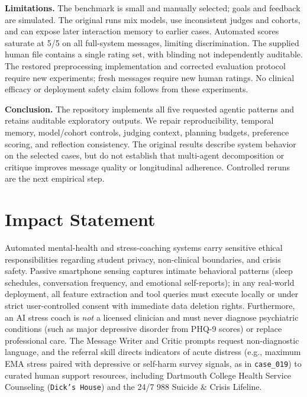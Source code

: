 \documentclass{article}
\begin{document}
\textbf{Limitations.} The benchmark is small and manually selected; goals and feedback are simulated. The original runs mix models, use inconsistent judges and cohorts, and can expose later interaction memory to earlier cases. Automated scores saturate at 5/5 on all full-system messages, limiting discrimination. The supplied human file contains a single rating set, with blinding not independently auditable. The restored preprocessing implementation and corrected evaluation protocol require new experiments; fresh messages require new human ratings. No clinical efficacy or deployment safety claim follows from these experiments.

\textbf{Conclusion.} The repository implements all five requested agentic patterns and retains auditable exploratory outputs. We repair reproducibility, temporal memory, model/cohort controls, judging context, planning budgets, preference scoring, and reflection consistency. The original results describe system behavior on the selected cases, but do not establish that multi-agent decomposition or critique improves message quality or longitudinal adherence. Controlled reruns are the next empirical step.

\section*{Impact Statement}

Automated mental-health and stress-coaching systems carry sensitive ethical responsibilities regarding student privacy, non-clinical boundaries, and crisis safety. Passive smartphone sensing captures intimate behavioral patterns (sleep schedules, conversation frequency, and emotional self-reports); in any real-world deployment, all feature extraction and tool queries must execute locally or under strict user-controlled consent with immediate data deletion rights. Furthermore, an AI stress coach is \emph{not} a licensed clinician and must never diagnose psychiatric conditions (such as major depressive disorder from PHQ-9 scores) or replace professional care. The Message Writer and Critic prompts request non-diagnostic language, and the referral skill directs indicators of acute distress (e.g., maximum EMA stress paired with depressive or self-harm survey signals, as in \texttt{case\_019}) to curated human support resources, including Dartmouth College Health Service Counseling (\texttt{Dick's House}) and the 24/7 988 Suicide \& Crisis Lifeline.



\end{document}
